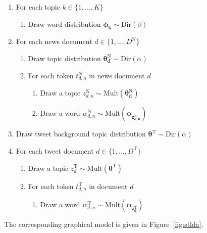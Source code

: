 \begin{enumerate}
\item For each topic $k \in \{1, \ldots, K\}$
    \begin{enumerate}
    \item Draw word distribution $\bm{\phi_k} \sim \mathrm{Dir}(\beta)$
    \end{enumerate}
\item For each news document $d\in \{1, \ldots, D^\mathrm{N}\}$
    \begin{enumerate}
    \item Draw topic distribution $\bm{\theta^{\mathrm{N}}_{d}} \sim \mathrm{Dir}(\alpha)$
    \item For each token $t^{\mathrm{N}}_{d,n}$ in news document $d$
        \begin{enumerate}
        \item Draw a topic $z^{\mathrm{N}}_{d,n} \sim \mathrm{Mult}(\bm{\theta^\mathrm{N}_d})$
        \item Draw a word $w^{\mathrm{N}}_{d,n} \sim \mathrm{Mult}(\bm{\phi_{z^{\mathrm{N}}_{d,n}}})$
        \end{enumerate}
    \end{enumerate}
\item Draw tweet background topic distribution $\bm{\theta^{\mathrm{T}}} \sim \mathrm{Dir}(\alpha)$
\item For each tweet document $d \in \{1, \ldots, D^\mathrm{T}\}$
    \begin{enumerate}
    \item Draw a topic $z^{\mathrm{T}}_d \sim \mathrm{Mult}(\bm{\theta^{\mathrm{T}}})$
    \item For each token $t^{\mathrm{T}}_{d,n}$ in document $d$
        \begin{enumerate}
        \item Draw a word $w^{\mathrm{T}}_{d,n} \sim \mathrm{Mult}(\bm{\phi_{z^{\mathrm{T}}_d}})$
        \end{enumerate}
    \end{enumerate}
\end{enumerate}

The corresponding graphical model is given in Figure~\ref{fig:stlda}.

